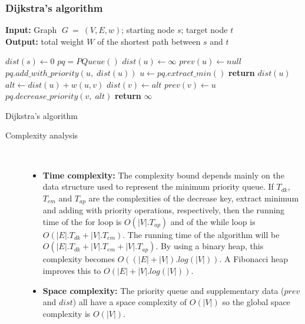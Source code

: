 \documentclass{article}
\begin{document}
\subsubsection{Dijkstra's algorithm}
\begin{algorithm}
\textbf{Input:} Graph $\;G\:=\:(V, E,w)$; starting node $s$; target node $t$\\
\textbf{Output:} total weight $W$ of the shortest path between $s$ and $t$
\begin{algorithmic}[1]
        \State $dist(s) \gets 0$
        \State $pq = PQueue()$
                \State $dist(u) \gets \infty$
                \State $prev(u) \gets null$
            \EndIf
            \State $pq.add\_with\_priority(u,\;dist(u))$
        \EndFor
            \State $u \gets pq.extract\_min()$
                \State \textbf{return} $dist(u)$
            \EndIf
                \State $alt \gets dist(u)+w(u,v)$
                    \State $dist(v)\gets alt$
                    \State $prev(v)\gets u$
                    \State $pq.decrease\_priority(v,\;alt)$
                \EndIf
            \EndFor
        \EndWhile
        \State \textbf{return} $\infty$
    \EndFunction
\end{algorithmic}
\caption{Dijkstra's algorithm}
\end{algorithm}
\begin{description}
\item[Complexity analysis]\
\begin{itemize}
    \item \textbf{Time complexity:} The complexity bound depends mainly on the data structure used to represent the minimum priority queue. If $T_{dk}$, $T_{em}$ and $T_{ap}$ are the complexities of the decrease key, extract minimum and adding with priority operations, respectively, then the running time of the for loop is $O(|V|.T_{ap})$ and of the while loop is $O(|E|.T_{dk}+|V|.T_{em})$. The running time of the algorithm will be $O(|E|.T_{dk}+|V|.T_{em}+|V|.T_{ap})$. By using a binary heap, this complexity becomes $O((|E|+|V|).log(|V|))$. A Fibonacci heap improves this to $O(|E|+|V|.log(|V|))$.
    \item \textbf{Space complexity:} The priority queue and supplementary data ($prev$ and $dist$) all have a space complexity of $O(|V|)$ so the global space complexity is $O(|V|)$.
\end{itemize}
\end{description}
\newpage
\end{document}
